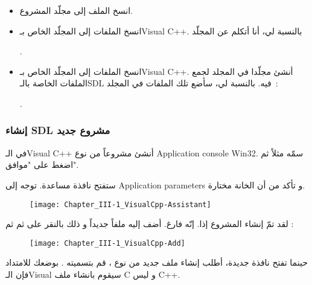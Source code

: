 \begin{itemize}
	\item انسخ الملف
	إلى مجلّد المشروع.
	\item انسخ الملفات
	إلى المجلّد 
	الخاص بـ\textenglish{Visual C++}.
	بالنسبة لي، أنا أتكلم عن المجلّد
	
	.
	
	\item انسخ الملفات
	إلى المجلّد
	الخاص بـ\textenglish{Visual C++}.
	أنشئ مجلّدا
	في المجلد
	لجمع الملفات
	الخاصة بالـ\textenglish{SDL}
	فيه. بالنسبة لي، سأضع تلك الملفات في المجلد~:
	
	.

\end{itemize}

\subsubsection{إنشاء \textenglish{SDL} مشروع جديد}

في الـ\textenglish{Visual C++}
أنشئ مشروعاً من نوع 
\textenglish{Application console Win32}.
سمّه مثلاً
ثم اضغط على "موافق".

ستفتح نافذة مساعدة. توجه إلى 
\textenglish{Application parameters}
و تأكد من أن الخانة
مختارة.

\begin{figure}[H]
	\centering
	\texttt{[image: Chapter\_III-1\_VisualCpp-Assistant]}
\end{figure}

لقد تمّ إنشاء المشروع إذا. إنّه فارغ. أضف إليه ملفاً جديداً و ذلك بالنقر على
ثم
ثم
 :

\begin{figure}[H]
	\centering
	\texttt{[image: Chapter\_III-1\_VisualCpp-Add]}
\end{figure}

حينما تفتح نافذة جديدة، أطلب إنشاء ملف جديد من نوع
،
قم بتسميته
.
بوضعك للامتداد
فإن الـ\textenglish{Visual}
سيقوم بانشاء ملف
\textenglish{C}
و ليس
\textenglish{C++}.

